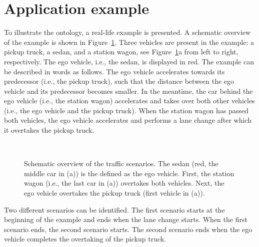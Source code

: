 \section{Application example}
\label{sec:example}

To illustrate the ontology, a real-life example is presented. A schematic overview of the example is shown in Figure~\ref{fig:example schematic}. Three vehicles are present in the example: a pickup truck, a sedan, and a station wagon, see Figure~\ref{fig:example schematic}a from left to right, respectively. The ego vehicle, i.e., the sedan, is displayed in red. The example can be described in words as follows. The ego vehicle accelerates towards its predecessor (i.e., the pickup truck), such that the distance between the ego vehicle and its predecessor becomes smaller. In the meantime, the car behind the ego vehicle (i.e., the station wagon) accelerates and takes over both other vehicles (i.e., the ego vehicle and the pickup truck). When the station wagon has passed both vehicles, the ego vehicle accelerates and performs a lane change after which it overtakes the pickup truck.

\begin{figure}
	\centering
	\setlength\figureheight{106pt}
	\setlength\figurewidth{260pt}
	\\
	\setlength\figureheight{100pt}
	\caption{Schematic overview of the traffic scenarios. The sedan (red, the middle car in (a)) is the defined as the ego vehicle. First, the station wagon (i.e., the last car in (a)) overtakes both vehicles. Next, the ego vehicle overtakes the pickup truck (first vehicle in (a)).}
	\label{fig:example schematic}
\end{figure}

Two different scenarios can be identified. The first scenario starts at the beginning of the example and ends when the lane change starts. When the first scenario ends, the second scenario starts. The second scenario ends when the ego vehicle completes the overtaking of the pickup truck.

